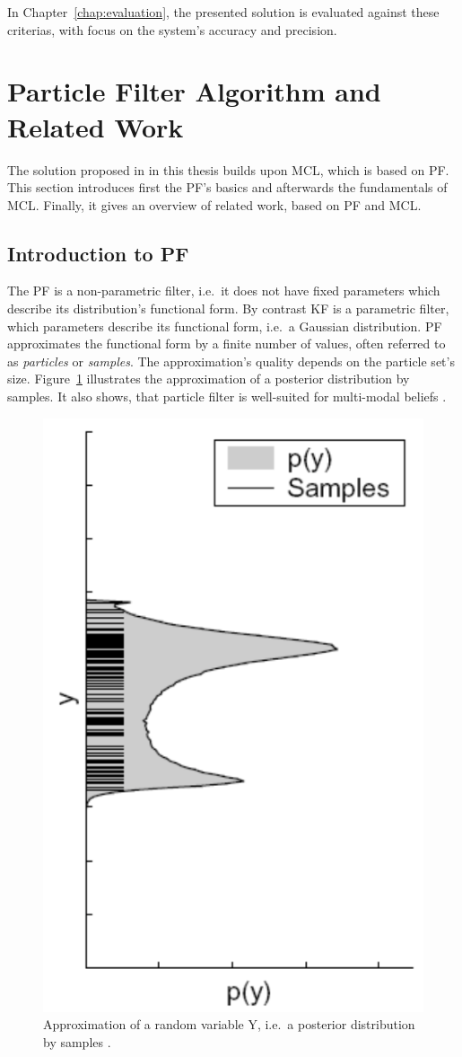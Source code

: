 \noindent In Chapter~\ref{chap:evaluation}, the presented solution is evaluated against these criterias, with focus on the system's accuracy and precision.


\section{Particle Filter Algorithm and Related Work}\label{sec:fund_pf}
The solution proposed in in this thesis builds upon \acf{MCL}, which is based on \acf{PF}. This section introduces first the \ac{PF}'s basics and afterwards the fundamentals of \ac{MCL}. Finally, it gives an overview of related work, based on \ac{PF} and \ac{MCL}.

\subsection{Introduction to \acl{PF}}
The \ac{PF} is a non-parametric filter, i.e.\ it does not have fixed parameters which describe its distribution's functional form. By contrast \acf{KF} is a parametric filter, which parameters describe its functional form, i.e.\ a Gaussian distribution. \ac{PF} approximates the functional form by a finite number of values, often referred to as \emph{particles} or \emph{samples}. The approximation's quality depends on the particle set's size. Figure~\ref{fig:pf_approx} illustrates the approximation of a posterior distribution by samples. It also shows, that particle filter is well-suited for multi-modal beliefs \citep{thrun:prob_robo}.

\begin{figure}
	\includegraphics[height=0.45\textwidth]{figures/pf_approx}
	\caption{Approximation of a random variable Y, i.e.\ a posterior distribution by samples \citep[p.97]{thrun:prob_robo}.}
	\label{fig:pf_approx}
\end{figure} 


